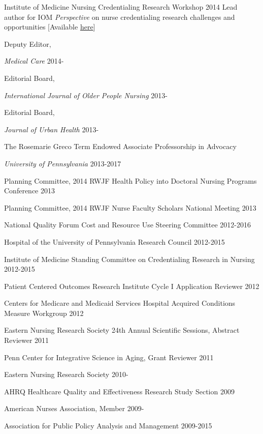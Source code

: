 \documentclass[10pt,]{article}
\begin{document}
{{{{{{{{{{{{{{{Institute of Medicine Nursing Credentialing Research Workshop \hfill 2014 \newline
\hspace*{0.5 cm} {Lead author for IOM {\textit {Perspective}} on nurse credentialing research challenges and opportunities} [Available \href{https://nam.edu/wp-content/uploads/2015/06/CredentialingResearchDesign.pdf}{\ttfamily here}]

Deputy Editor, {\textit {Medical Care} \hfill {2014-{\small{}}} 

Editorial Board, {\textit {International Journal of Older People Nursing} \hfill {2013-{\small{}}}	

Editorial Board, {\textit {Journal of Urban Health} \hfill {2013-{\small{}}}	

The Rosemarie Greco Term Endowed Associate Professorship in Advocacy {\textit {University of Pennsylvania} \hfill 2013-2017 

Planning Committee, 2014 RWJF Health Policy into Doctoral Nursing Programs Conference \hfill 2013 

Planning Committee, 2014 RWJF Nurse Faculty Scholars National Meeting \hfill 2013 

National Quality Forum Cost and Resource Use Steering Committee \hfill 2012-2016 

Hospital of the University of Pennsylvania Research Council \hfill 2012-2015 

Institute of Medicine Standing Committee on Credentialing Research in Nursing \hfill 2012-2015 

Patient Centered Outcomes Research Institute Cycle I Application Reviewer \hfill 2012 

Centers for Medicare and Medicaid Services Hospital Acquired Conditions Measure Workgroup \hfill 2012 

Eastern Nursing Research Society 24th Annual Scientific Sessions, Abstract Reviewer \hfill 2011 

Penn Center for Integrative Science in Aging, Grant Reviewer  \hfill 2011 

Eastern Nursing Research Society \hfill {2010-{\small{}}}

AHRQ Healthcare Quality and Effectiveness Research Study Section \hfill 2009	

American Nurses Association, Member \hfill {2009-{\small{}}}

Association for Public Policy Analysis and Management \hfill 2009-2015

}}}}}}}}}}}}}}}}}}}
\end{document}
